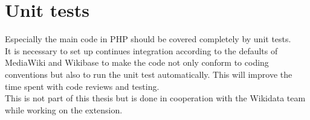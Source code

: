 \section {Unit tests}
Especially the main code in PHP should be covered completely by unit tests.\\
It is necessary to set up continues integration according to the defaults of MediaWiki and Wikibase to make the code not only conform to coding conventions but also to run the unit test automatically. This will improve the time spent with code reviews and testing. \\
This is not part of this thesis but is done in cooperation with the Wikidata team while working on the extension.